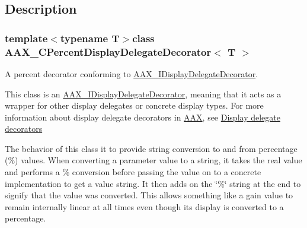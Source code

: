 \subsection{Description}
\subsubsection*{template$<$typename T$>$class A\+A\+X\+\_\+\+C\+Percent\+Display\+Delegate\+Decorator$<$ T $>$}

A percent decorator conforming to \hyperlink{a00094}{A\+A\+X\+\_\+\+I\+Display\+Delegate\+Decorator}. 

This class is an \hyperlink{a00094}{A\+A\+X\+\_\+\+I\+Display\+Delegate\+Decorator}, meaning that it acts as a wrapper for other display delegates or concrete display types. For more information about display delegate decorators in \hyperlink{a00288}{A\+A\+X}, see \hyperlink{a00346_displaydelegates_decorators}{Display delegate decorators}

The behavior of this class it to provide string conversion to and from percentage (\%) values. When converting a parameter value to a string, it takes the real value and performs a \% conversion before passing the value on to a concrete implementation to get a value string. It then adds on the \char`\"{}\%\char`\"{} string at the end to signify that the value was converted. This allows something like a gain value to remain internally linear at all times even though its display is converted to a percentage.

